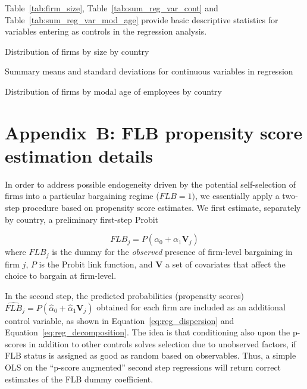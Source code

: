 \documentclass[12pt]{article}
\begin{document}
\bigskip

Table~\ref{tab:firm_size}, Table~\ref{tab:sum_reg_var_cont} and Table~\ref{tab:sum_reg_var_mod_age} provide basic descriptive statistics for variables entering as controls in the regression analysis.

\begin{table}[ht]
\centering
\small
\caption{Distribution of firms by size by country}
\label{tab:firm_size}

\end{table}

\begin{table}[htp]
\caption{Summary means and standard deviations for continuous variables in regression}
\label{tab:sum_reg_var_cont}
\centering
\small

\end{table}

\begin{table}[ht]
\caption{Distribution of firms by modal age of employees by country}
\label{tab:sum_reg_var_mod_age}
\centering
\small

\end{table}


\clearpage

\section*{Appendix~B: FLB propensity score estimation details}

In order to address possible endogeneity driven by the potential self-selection of firms into a particular bargaining regime ($\mathit{FLB}=1)$, we essentially apply a two-step procedure based on propensity score estimates. We first estimate, separately by country, a preliminary first-step Probit

\begin{equation}
\label{eq:reg_propensity}
  \mathit{FLB}_j = \mathit{P}\left( \alpha_0 + \alpha_1\bm{V}_j \right)
\end{equation}
where $\mathit{FLB}_j$ is the dummy for the \emph{observed} presence of firm-level bargaining in firm $j$, $\mathit{P}$ is the Probit link function, and $\bm{V}$ a set of covariates that affect the choice to bargain at firm-level.

In the second step, the predicted probabilities (propensity scores)
$\widehat{\mathit{FLB}}_j = \mathit{P}\left( \hat{\alpha}_0 +
  \hat{\alpha}_1\bm{V}_j \right)$ obtained for each firm are included
as an additional control variable, as shown in Equation~\ref{eq:reg_dispersion} and Equation~\ref{eq:reg_decomposition}. The idea is that conditioning also upon the p-scores in addition to other controls solves selection due to unobserved factors, if FLB status is assigned as good as random based on observables. Thus, a simple OLS on the “p-score augmented” second step regressions will return correct estimates of the FLB dummy coefficient.
\end{document}
